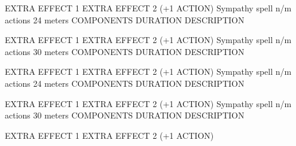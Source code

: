         EXTRA EFFECT 1
        EXTRA EFFECT 2 (+1 ACTION)
        {Sympathy spell}
        {n/m actions}
        {24 meters}
        {COMPONENTS}
        {DURATION}
        DESCRIPTION

        EXTRA EFFECT 1
        EXTRA EFFECT 2 (+1 ACTION)
        {Sympathy spell}
        {n/m actions}
        {30 meters}
        {COMPONENTS}
        {DURATION}
        DESCRIPTION

        EXTRA EFFECT 1
        EXTRA EFFECT 2 (+1 ACTION)
        {Sympathy spell}
        {n/m actions}
        {24 meters}
        {COMPONENTS}
        {DURATION}
        DESCRIPTION

        EXTRA EFFECT 1
        EXTRA EFFECT 2 (+1 ACTION)
        {Sympathy spell}
        {n/m actions}
        {30 meters}
        {COMPONENTS}
        {DURATION}
        DESCRIPTION

        EXTRA EFFECT 1
        EXTRA EFFECT 2 (+1 ACTION)
